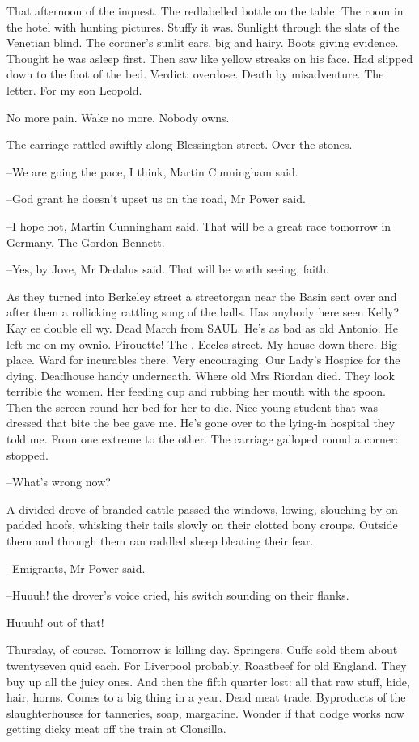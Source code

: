 That afternoon of the inquest.
The redlabelled bottle on the table.
The room in the hotel with hunting pictures.
Stuffy it was.
Sunlight through the slats of the Venetian blind.
The coroner's sunlit ears, big and hairy.
Boots giving evidence.
Thought he was asleep first.
Then saw like yellow streaks on his face.
Had slipped down to the foot of the bed.
Verdict:
overdose.
Death by misadventure.
The letter.
For my son Leopold.

No more pain.
Wake no more.
Nobody owns.

The carriage rattled swiftly along Blessington street.
Over the stones.

--We are going the pace, I think,
Martin Cunningham said.

--God grant he doesn't upset us on the road,
Mr Power said.

--I hope not,
Martin Cunningham said.
That will be a great race tomorrow in Germany.
The Gordon Bennett.

--Yes, by Jove,
Mr Dedalus said.
That will be worth seeing, faith.

As they turned into Berkeley street
a streetorgan near the Basin sent over and after them
a rollicking rattling song of the halls.
Has anybody here seen Kelly?
Kay ee double ell wy.
Dead March from SAUL.
He's as bad
as old Antonio.
 He left me on my ownio.
 Pirouette!
The .
Eccles street.
My house down there.
Big place.
Ward for incurables there.
Very encouraging.
Our Lady's Hospice for the dying.
Deadhouse handy underneath.
Where old Mrs Riordan died.
They look terrible the women.
Her feeding cup and rubbing her mouth with the spoon.
Then the screen round her bed for her to die.
Nice young student that was dressed that bite the bee gave me.
He's gone over to the lying-in hospital they told me.
From one extreme to the other.
The carriage galloped round a corner:
stopped.

--What's wrong now?

A divided drove of branded cattle passed the windows,
lowing,
slouching by on padded hoofs,
whisking their tails slowly on their clotted bony croups.
Outside them and through them ran
raddled sheep bleating their fear.

--Emigrants,
Mr Power said.

--Huuuh!
the drover's voice cried,
his switch sounding on their flanks.

Huuuh!
out of that!

Thursday, of course.
Tomorrow is killing day.
Springers.
Cuffe sold them about twentyseven quid each.
For Liverpool probably.
Roastbeef for old England.
They buy up all the juicy ones.
And then the fifth quarter lost:
all that raw stuff, hide, hair, horns.
Comes to a big thing in a year.
Dead meat trade.
Byproducts of the slaughterhouses for tanneries, soap, margarine.
Wonder if that dodge works now
getting dicky meat off the train at Clonsilla.


